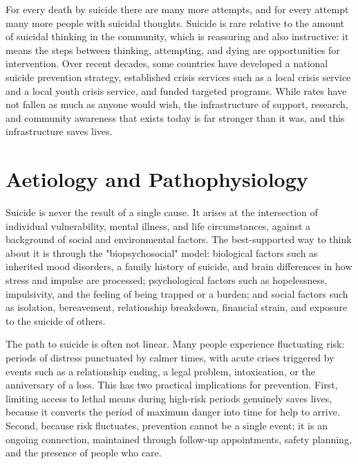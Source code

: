 For every death by suicide there are many more attempts, and for every attempt many more people with suicidal thoughts. Suicide is rare relative to the amount of suicidal thinking in the community, which is reassuring and also instructive: it means the steps between thinking, attempting, and dying are opportunities for intervention. Over recent decades, some countries have developed a national suicide prevention strategy, established crisis services such as a local crisis service and a local youth crisis service, and funded targeted programs. While rates have not fallen as much as anyone would wish, the infrastructure of support, research, and community awareness that exists today is far stronger than it was, and this infrastructure saves lives.

\section*{Aetiology and Pathophysiology}
Suicide is never the result of a single cause. It arises at the intersection of individual vulnerability, mental illness, and life circumstances, against a background of social and environmental factors. The best-supported way to think about it is through the "biopsychosocial" model: biological factors such as inherited mood disorders, a family history of suicide, and brain differences in how stress and impulse are processed; psychological factors such as hopelessness, impulsivity, and the feeling of being trapped or a burden; and social factors such as isolation, bereavement, relationship breakdown, financial strain, and exposure to the suicide of others.

The path to suicide is often not linear. Many people experience fluctuating risk: periods of distress punctuated by calmer times, with acute crises triggered by events such as a relationship ending, a legal problem, intoxication, or the anniversary of a loss. This has two practical implications for prevention. First, limiting access to lethal means during high-risk periods genuinely saves lives, because it converts the period of maximum danger into time for help to arrive. Second, because risk fluctuates, prevention cannot be a single event; it is an ongoing connection, maintained through follow-up appointments, safety planning, and the presence of people who care.

